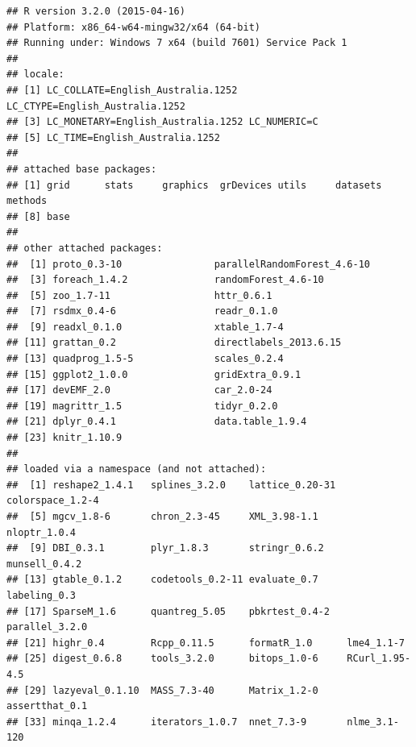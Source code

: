 \documentclass{grattan}\usepackage[]{graphicx}\usepackage[]{color}
\makeatletter
\newenvironment{kframe}{%
 \def\at@end@of@kframe{}%
 \ifinner\ifhmode%
  \def\at@end@of@kframe{\end{minipage}}%
  \begin{minipage}{\columnwidth}%
 \fi\fi%
 \def\FrameCommand##1{\hskip\@totalleftmargin \hskip-\fboxsep
 \colorbox{shadecolor}{##1}\hskip-\fboxsep
     \hskip-\linewidth \hskip-\@totalleftmargin \hskip\columnwidth}%
 \MakeFramed {\advance\hsize-\width
   \@totalleftmargin\z@ \linewidth\hsize
   \@setminipage}}%
 {\par\unskip\endMakeFramed%
 \at@end@of@kframe}
\newenvironment{knitrout}{}{} %
\makeatother
\begin{document}
\begin{knitrout}
\color{fgcolor}\begin{kframe}
\begin{verbatim}
## R version 3.2.0 (2015-04-16)
## Platform: x86_64-w64-mingw32/x64 (64-bit)
## Running under: Windows 7 x64 (build 7601) Service Pack 1
## 
## locale:
## [1] LC_COLLATE=English_Australia.1252  LC_CTYPE=English_Australia.1252   
## [3] LC_MONETARY=English_Australia.1252 LC_NUMERIC=C                      
## [5] LC_TIME=English_Australia.1252    
## 
## attached base packages:
## [1] grid      stats     graphics  grDevices utils     datasets  methods  
## [8] base     
## 
## other attached packages:
##  [1] proto_0.3-10                parallelRandomForest_4.6-10
##  [3] foreach_1.4.2               randomForest_4.6-10        
##  [5] zoo_1.7-11                  httr_0.6.1                 
##  [7] rsdmx_0.4-6                 readr_0.1.0                
##  [9] readxl_0.1.0                xtable_1.7-4               
## [11] grattan_0.2                 directlabels_2013.6.15     
## [13] quadprog_1.5-5              scales_0.2.4               
## [15] ggplot2_1.0.0               gridExtra_0.9.1            
## [17] devEMF_2.0                  car_2.0-24                 
## [19] magrittr_1.5                tidyr_0.2.0                
## [21] dplyr_0.4.1                 data.table_1.9.4           
## [23] knitr_1.10.9               
## 
## loaded via a namespace (and not attached):
##  [1] reshape2_1.4.1   splines_3.2.0    lattice_0.20-31  colorspace_1.2-4
##  [5] mgcv_1.8-6       chron_2.3-45     XML_3.98-1.1     nloptr_1.0.4    
##  [9] DBI_0.3.1        plyr_1.8.3       stringr_0.6.2    munsell_0.4.2   
## [13] gtable_0.1.2     codetools_0.2-11 evaluate_0.7     labeling_0.3    
## [17] SparseM_1.6      quantreg_5.05    pbkrtest_0.4-2   parallel_3.2.0  
## [21] highr_0.4        Rcpp_0.11.5      formatR_1.0      lme4_1.1-7      
## [25] digest_0.6.8     tools_3.2.0      bitops_1.0-6     RCurl_1.95-4.5  
## [29] lazyeval_0.1.10  MASS_7.3-40      Matrix_1.2-0     assertthat_0.1  
## [33] minqa_1.2.4      iterators_1.0.7  nnet_7.3-9       nlme_3.1-120
\end{verbatim}
\end{kframe}
\end{knitrout}
\twocolumn

\printbibliography
\end{document}
